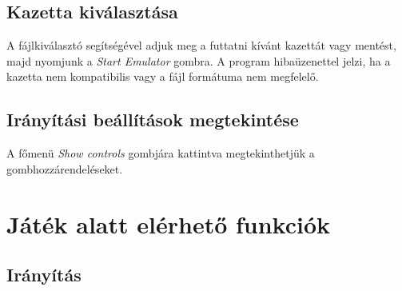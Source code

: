 \subsection{Kazetta kiválasztása}

A fájlkiválasztó segítségével adjuk meg a futtatni kívánt kazettát vagy mentést, majd nyomjunk a \emph{Start Emulator} gombra.
A program hibaüzenettel jelzi, ha a kazetta nem kompatibilis vagy a fájl formátuma nem megfelelő.

\subsection{Irányítási beállítások megtekintése}

A főmenü \emph{Show controls} gombjára kattintva megtekinthetjük a gombhozzárendeléseket.

\section{Játék alatt elérhető funkciók}

\subsection {Irányítás}

